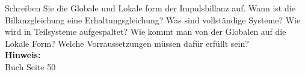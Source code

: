 \begin{question}[section=2,subsection=23,name={Impulsbillanz},difficulty=5,type=mdl,tags={20161207}]
	Schreiben Sie die Globale und Lokale form der Impulsbillanz auf. Wann ist die Billanzgleichung eine Erhaltungsgleichung? Was sind vollständige Systeme? Wie wird in Teilsysteme aufgespaltet? Wie kommt man von der Globalen auf die Lokale Form? Welche Vorraussetzungen müssen dafür erfüllt sein? 
	\\ \textbf{Hinweis:}\\
	Buch Seite 50
\end{question}
\begin{solution}
	
\end{solution}
